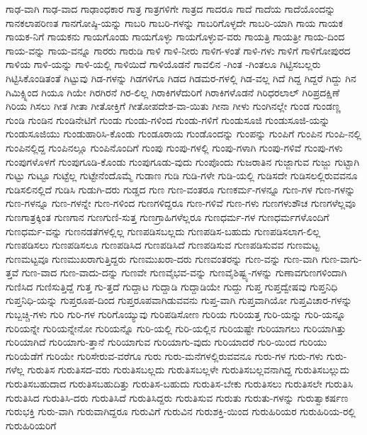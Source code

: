 {ಗಾಢ-ವಾಗಿ
ಗಾಢ-ವಾದ
ಗಾಢಾಂಧಕಾರ
ಗಾತ್ರ
ಗಾತ್ರಗಳಿಗೇ
ಗಾತ್ರದ
ಗಾದರೂ
ಗಾದೆ
ಗಾದೆಯ
ಗಾದೆಯೊಂದನ್ನು
ಗಾನಕಲಾಪರಿಣತ
ಗಾನಗೋಷ್ಠಿ-ಯನ್ನು
ಗಾಬರಿ
ಗಾಬರಿ-ಗಳನ್ನು
ಗಾಬರಿಗೊಳ್ಳದೇ
ಗಾಬರಿ-ಯಾಗಿ
ಗಾಯ
ಗಾಯಕ
ಗಾಯಕ-ನಿಗೆ
ಗಾಯಕನು
ಗಾಯಗೊಂಡು
ಗಾಯಗೊಳ್ಳು
ಗಾಯಗೊಳ್ಳುವ-ವರು
ಗಾಯತ್ರಿ
ಗಾಯತ್ರೀ
ಗಾಯ-ದಿಂದ
ಗಾಯ-ವನ್ನು
ಗಾಯ-ವನ್ನೂ
ಗಾರರು
ಗಾರುಡಿ
ಗಾಳಿ
ಗಾಳಿ-ನೀರು
ಗಾಳಿಗ-ಳಂತೆ
ಗಾಳಿ-ಗಳು
ಗಾಳಿಗೆ
ಗಾಳಿಗೋಪುರದ
ಗಾಳಿಯ
ಗಾಳಿ-ಯನ್ನು
ಗಾಳಿ-ಯಲ್ಲಿ
ಗಾಳಿಯಿದೆ
ಗಾಳಿಯೊಡನೆ
ಗಾವಲಿನ
-ಗಿಂತ
-ಗಿಂತಲೂ
ಗಿಟ್ಟಿಸಬಲ್ಲರು
ಗಿಟ್ಟಿಸಿಕೊಂಡಿತಂತೆ
ಗಿಟ್ಟುವು
ಗಿಡ-ಗಳನ್ನು
ಗಿಡಗಳಿಗೂ
ಗಿಡದ
ಗಿಡಮರ-ಗಳಲ್ಲಿ
ಗಿಡ-ವಲ್ಲ
ಗಿದೆ
ಗಿದ್ದ
ಗಿದ್ದರೆ
ಗಿದ್ದು
ಗಿನ
ಗಿಮಿಕ್ಸ್ನಿಂದ
ಗಿಯೂ
ಗಿಯೇ
ಗಿರಗಿರನೆ
ಗಿರ-ಲಿಲ್ಲ
ಗಿರಾಕಿಗಳೆದುರಿಗೆ
ಗಿರಾಕಿಗಳೊಡನೆ
ಗಿರಿಧರಲಾಲ್
ಗಿರಿಪ್ರದಕ್ಷಿಣೆ
ಗಿರಿಯ
ಗಿಸಲು
ಗೀತ
ಗೀತಾ
ಗೀತೋಕ್ತಿಗೆ
ಗೀತೋಪದೇಶ-ವಾ-ಯಿತು
ಗೀನಾ
ಗೀಳು
ಗುಂಗಿನಲ್ಲೇ
ಗುಂಡ
ಗುಂಡಣ್ಣ
ಗುಂಡಿ
ಗುಂಡಿನ
ಗುಂಡಿನೇಟಿಗೆ
ಗುಂಡು
ಗುಂಡು-ಗಳಿಂದ
ಗುಂಡು-ಗಳಿಗೆ
ಗುಂಡುಸೂಜಿ
ಗುಂಡುಸೂಜಿ-ಯನ್ನು
ಗುಂಡುಸೂಜಿಯು
ಗುಂಡುಹಾರಿಸಿ-ಕೊಂಡು
ಗುಂಡೂರಾಯ
ಗುಂಡೊಂದನ್ನು
ಗುಂಪನ್ನು
ಗುಂಪಿಗೆ
ಗುಂಪಿನ
ಗುಂಪಿ-ನಲ್ಲಿ
ಗುಂಪಿನಲ್ಲಿದ್ದ
ಗುಂಪಿನಲ್ಲೂ
ಗುಂಪಿನೊಂದಿಗೆ
ಗುಂಪು
ಗುಂಪು-ಗಳಲ್ಲಿ
ಗುಂಪು-ಗಳಾಗಿ
ಗುಂಪು-ಗಳಿವೆ
ಗುಂಪು-ಗಳು
ಗುಂಪುಗಳೊಳಗೆ
ಗುಂಪುಗೂಡಿ-ಕೊಂಡು
ಗುಂಪುಗೂಡು-ವುದು
ಗುಂಪೊಂದು
ಗುಜರಾತಿನ
ಗುಜ್ಜಾಗುವ
ಗುಜ್ಜು
ಗುಟ್ಟಾಗಿ
ಗುಟ್ಟು
ಗುಟ್ಟೂ
ಗುಟ್ಟೆಲ್ಲ
ಗುಟ್ಟೇನೆಂದೊಮ್ಮೆ
ಗುಡಾಣ
ಗುಡಿ
ಗುಡಿ-ಗಳೇ
ಗುಡಿ-ಯಲ್ಲಿ
ಗುಡಿಸದೇ
ಗುಡಿಸಲಲ್ಲಿರುವವನೂ
ಗುಡಿಸಲಿನಲ್ಲಿದೆ
ಗುಡಿಸಿ
ಗುಡುಗಿ-ದರು
ಗುಡ್ಡದ
ಗುಣ
ಗುಣ-ವಂತರೂ
ಗುಣಕರ್ಮ-ಗಳನ್ನೂ
ಗುಣ-ಗಳ
ಗುಣ-ಗಳನ್ನು
ಗುಣ-ಗಳನ್ನೂ
ಗುಣ-ಗಳನ್ನೇ
ಗುಣ-ಗಳಿಂದ
ಗುಣಗಳಿದ್ದರೂ
ಗುಣ-ಗಳಿವೆ
ಗುಣ-ಗಳು
ಗುಣಗಳುಶೌಚ
ಗುಣಗಳೆಲ್ಲವೂ
ಗುಣಗಾತ್ರಕ್ಕಿಂತ
ಗುಣಗಾನ
ಗುಣಗುಣಿ-ಸುತ್ತ
ಗುಣಗ್ರಾಹಿಗಳೆಲ್ಲರೂ
ಗುಣಧರ್ಮ-ಗಳ
ಗುಣಧರ್ಮಗಳೊಂದಿಗೆ
ಗುಣಧರ್ಮ-ವನ್ನು
ಗುಣನಡತೆಗಳಲ್ಲಿಲ್ಲ
ಗುಣಪಡಿಸಬಲ್ಲದು
ಗುಣಪಡಿಸ-ಬಹುದು
ಗುಣಪಡಿಸಲಾಗ-ಲಿಲ್ಲ
ಗುಣಪಡಿಸಲು
ಗುಣಪಡಿಸಲೂ
ಗುಣಪಡಿಸಿದ
ಗುಣಪಡಿಸಿದೆ
ಗುಣಪಡಿಸುವ
ಗುಣಪಡಿಸುವವ
ಗುಣಮಟ್ಟ
ಗುಣಮಟ್ಟವೂ
ಗುಣಮುಖರಾಗುತ್ತಿದ್ದರು
ಗುಣಮುಖರಾ-ದರು
ಗುಣವಂತರನ್ನು
ಗುಣ-ವನ್ನು
ಗುಣ-ವಾಗಿ
ಗುಣ-ವಾಗು-ತ್ತವೆ
ಗುಣ-ವಾದ
ಗುಣ-ವಾದು-ದನ್ನು
ಗುಣವೇ
ಗುಣವೈಭವ-ವನ್ನು
ಗುಣವೈಶಿಷ್ಟ್ಯ-ಗಳನ್ನು
ಗುಣಾವಗುಣಗಳಿಂದಾಗಿ
ಗುಣಿಸಿದ
ಗುಣಿಸುತ್ತಿದ್ದೆ
ಗುತ್ತ
ಗು-ತ್ತದೆ
ಗುದ್ದಾಟ
ಗುದ್ದಾಡಿ
ಗುದ್ದಾಡಿಯೇ
ಗುದ್ದು
ಗುಪ್ತ
ಗುಪ್ತದ್ವೇಷವು
ಗುಪ್ತನಿಧಿ
ಗುಪ್ತನಿಧಿ-ಯನ್ನು
ಗುಪ್ತರೂಪ-ದಿಂದ
ಗುಪ್ತರೂಪವಾಗಿಡುವವನು
ಗುಪ್ತ-ವಾಗಿ
ಗುಪ್ತವಾಗಿಯೋ
ಗುಪ್ತವಿಚಾರ-ಗಳನ್ನು
ಗುಬ್ಬಚ್ಚಿ-ಗಳು
ಗುರಿ
ಗುರಿ-ಗಳ
ಗುರಿಗೊಯ್ಯುವು
ಗುರಿಪಡಿಸೋಣ
ಗುರಿಯ
ಗುರಿಯತ್ತ
ಗುರಿ-ಯನ್ನು
ಗುರಿ-ಯನ್ನೂ
ಗುರಿಯನ್ನೇ
ಗುರಿಯನ್ನೇನೋ
ಗುರಿಯನ್ನೊ
ಗುರಿ-ಯಲ್ಲಿ
ಗುರಿ-ಯಲ್ಲಿನ
ಗುರಿಯಷ್ಟೇ
ಗುರಿಯಾಗಲು
ಗುರಿಯಾಗಿತ್ತು
ಗುರಿಯಾಗಿದೆ
ಗುರಿಯಾಗು-ತ್ತಾನೆ
ಗುರಿಯಾಗುವ
ಗುರಿಯಾಗು-ವುದು
ಗುರಿಯಾದರೆ
ಗುರಿ-ಯಿಂದ
ಗುರಿಯು
ಗುರಿಯೆಡೆಗೆ
ಗುರಿಯೇ
ಗುರಿಸೇರುವ-ವರೆಗೂ
ಗುರು
ಗುರು-ಮನೆಗಳಲ್ಲಿರುವವನೂ
ಗುರು-ಗಳ
ಗುರು-ಗಳು
ಗುರು-ಗಳೆಲ್ಲ
ಗುರುತಿಸ
ಗುರುತಿಸದ-ವರು
ಗುರುತಿಸಬಲ್ಲದು
ಗುರುತಿಸಬಲ್ಲಳೇ
ಗುರುತಿಸಬಲ್ಲವನಾಗಿದ್ದ
ಗುರುತಿಸಬಲ್ಲುದು
ಗುರುತಿಸಬಹುದಾದ
ಗುರುತಿಸಬಹುದಿತ್ತು
ಗುರುತಿಸ-ಬಹುದು
ಗುರುತಿಸ-ಬೇಕು
ಗುರುತಿಸಲು
ಗುರುತಿಸಲೇ
ಗುರುತಿಸಿ
ಗುರುತಿಸಿದ
ಗುರುತಿಸಿ-ದರು
ಗುರುತಿಸಿದೆ
ಗುರುತಿಸಿದ್ದರು
ಗುರುತಿಸುವ
ಗುರುತು
ಗುರುತು-ಗಳನ್ನು
ಗುರುತ್ವಾಕರ್ಷಣ
ಗುರುಭಕ್ತಿ
ಗುರು-ವಾಗಿ
ಗುರುವಾಗಿದ್ದರೂ
ಗುರುವಿಗೆ
ಗುರುವಿನ
ಗುರುಶಕ್ತಿ-ಯಿಂದ
ಗುರುಹಿರಿಯರ
ಗುರುಹಿರಿಯ-ರಲ್ಲಿ
ಗುರುಹಿರಿಯರಿಗೆ
}
